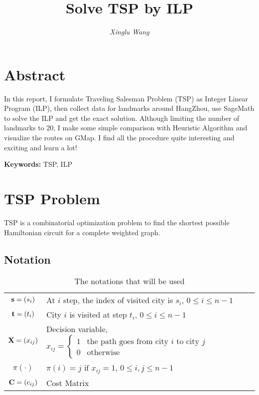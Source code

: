 \documentclass{mcmthesis}
\title{Solve   TSP by ILP}
\author{{\itshape Xinglu Wang} \quad {\itshape 3140102282} \quad {\itshape ISEE 1403, ZJU}}
\begin{document}
\maketitle
 
\setcounter{tocdepth}{2} %
\tableofcontents
		
\section*{Abstract }
In this report, I  formulate Traveling Salesman Problem (TSP) as  Integer Linear Program (ILP), then collect data for landmarks around HangZhou, use SageMath to solve the ILP and get the exact solution. Although limiting the number of landmarks to $20$, I make some simple comparison with Heuristic Algorithm and visualize the routes on GMap. I find all the procedure  quite interesting and exciting and learn  a lot!

\textbf{Keywords:} TSP, ILP
\section{TSP Problem}
TSP is a combinatorial optimization problem to find the shortest possible Hamiltonian circuit for a complete weighted graph. %
\subsection{Notation}	 
\begin{table} 
	\centering
	{\begin{tabular}{c|l} 
	\hline
	$\mathbf{s} = (s_i)$ & At $i$ step, the index of visited city is $s_i$, $ 0 \le i \le n-1$\\
	$\mathbf{t}= (t_i)$ & City $i$ is visited at step $t_i$, $ 0 \le i \le n-1$\\ \hline \hline
	$\mathbf{X} = (x_{i j} )$ & Decision variable, $x_{ij}={\begin{cases}1&{\text{the path goes from city }}i{\text{ to city }}j\\0&{\text{otherwise}}\end{cases}}$  \\
	$\pi(\cdot )$ & $\pi(i)=j  \text{ if } x_{i j}=1$, $ 0 \le i,j \le n-1$ \\ \hline \hline
	$\mathbf{C}=(c_{ij})$ & Cost Matrix \\ 
	\hline
	\end{tabular}
	\caption{The notations that will be used}
	\label{tab:ok}}
\end{table}
\end{document}
